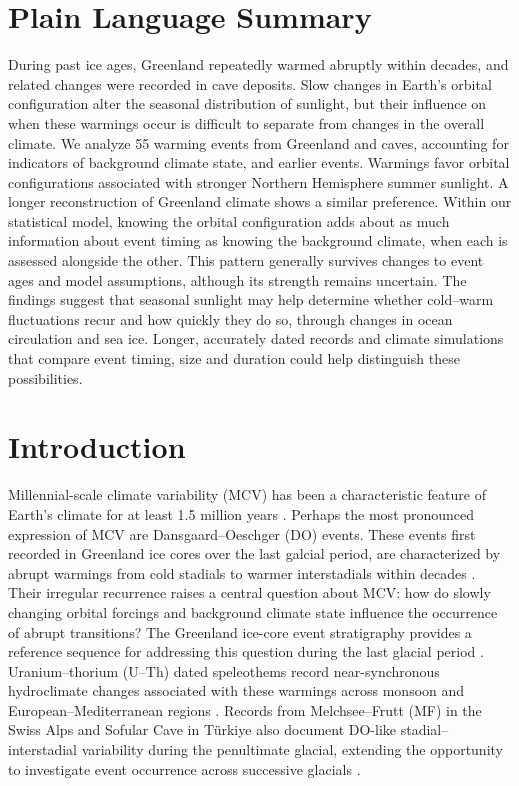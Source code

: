 \documentclass[11pt]{article}
\begin{document}
\section*{Plain Language Summary}
During past ice ages, Greenland repeatedly warmed abruptly within decades, and related changes were recorded in cave deposits. Slow changes in Earth's orbital configuration alter the seasonal distribution of sunlight, but their influence on when these warmings occur is difficult to separate from changes in the overall climate. We analyze 55 warming events from Greenland and caves, accounting for indicators of background climate state, and earlier events. Warmings favor orbital configurations associated with stronger Northern Hemisphere summer sunlight. A longer reconstruction of Greenland climate shows a similar preference. Within our statistical model, knowing the orbital configuration adds about as much information about event timing as knowing the background climate, when each is assessed alongside the other. This pattern generally survives changes to event ages and model assumptions, although its strength remains uncertain. The findings suggest that seasonal sunlight may help determine whether cold--warm fluctuations recur and how quickly they do so, through changes in ocean circulation and sea ice. Longer, accurately dated records and climate simulations that compare event timing, size and duration could help distinguish these possibilities.

\section{Introduction}
Millennial-scale climate variability (MCV) has been a characteristic feature of Earth's climate for at least 1.5 million years \citep{hodell20231}. Perhaps the most pronounced expression of MCV are Dansgaard--Oeschger (DO) events.  These events first recorded in Greenland ice cores over the last galcial period, are characterized by abrupt warmings from cold stadials to warmer interstadials within decades \citep{dansgaard1993evidence}. Their irregular recurrence raises a central question about MCV: how do slowly changing orbital forcings and background climate state influence the occurrence of abrupt transitions? The Greenland ice-core event stratigraphy provides a reference sequence for addressing this question during the last glacial period \citep{rasmussen2014stratigraphic}. Uranium--thorium (U--Th) dated speleothems record near-synchronous hydroclimate changes associated with these warmings across monsoon and European--Mediterranean regions \citep{corrick2020synchronous}. Records from Melchsee--Frutt (MF) in the Swiss Alps and Sofular Cave in T\"urkiye also document DO-like stadial--interstadial variability during the penultimate glacial, extending the opportunity to investigate event occurrence across successive glacials \citep{fohlmeister2023role,held2024dansgaard}.
\end{document}
